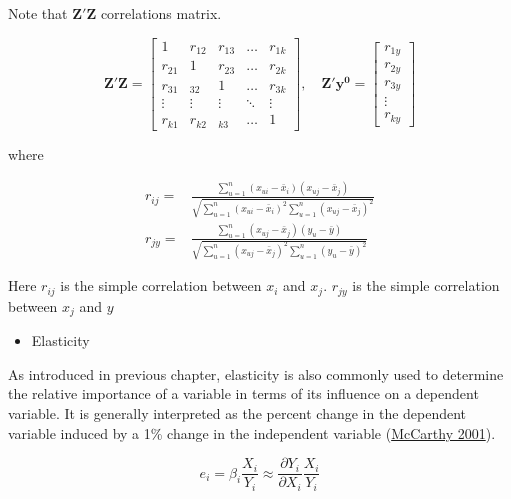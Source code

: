 \documentclass[
  11pt,
  openany]{memoir}
\providecommand{\tightlist}{%
  \setlength{\itemsep}{0pt}\setlength{\parskip}{0pt}}
\begin{document}
Note that \(\mathbf{Z'Z}\) correlations matrix.

\begin{equation}
\mathbf{Z'Z}=\begin{bmatrix} 
1 & r_{12} & r_{13} & \dots & r_{1k} \\  
r_{21} & 1 & r_{23} & \dots & r_{2k} \\  
r_{31} & _{32} & 1 & \dots & r_{3k} \\  
\vdots & \vdots & \vdots & \ddots & \vdots \\  
r_{k1} & r_{k2} & _{k3} & \dots & 1  \end{bmatrix},\quad 
\mathbf{Z'}\mathbf{y^{0}}=\begin{bmatrix} 
r_{1y} \\ r_{2y} \\ r_{3y} \\ \vdots \\ r_{ky} \end{bmatrix}
\label{eq:corr-matrix}
\end{equation}

where

\begin{equation}
\begin{split}
r_{ij}=&\frac{\sum_{u=1}^{n}(x_{ui}-\bar x_i)(x_{uj}-\bar x_j)}{\sqrt{\sum_{u=1}^{n}(x_{ui}-\bar x_i)^2\sum_{u=1}^{n}(x_{uj}-\bar x_j)^2}}\\
r_{jy}=&\frac{\sum_{u=1}^{n}(x_{uj}-\bar x_j)(y_{u}-\bar y)}{\sqrt{\sum_{u=1}^{n}(x_{uj}-\bar x_j)^2\sum_{u=1}^{n}(y_{u}-\bar y)^2}}
\end{split}
\label{eq:corr-1}
\end{equation}

Here \(r_{ij}\) is the simple correlation between \(x_i\) and \(x_j\). \(r_{jy}\) is the simple correlation between \(x_j\) and \(y\)

\begin{itemize}
\tightlist
\item
  Elasticity
\end{itemize}

As introduced in previous chapter, elasticity is also commonly used to determine the relative importance of a variable in terms of its influence on a dependent variable. It is generally interpreted as the percent change in the dependent variable induced by a 1\% change in the independent variable (\protect\hyperlink{ref-mccarthyTransportationEconomicsTheory2001}{McCarthy 2001}).

\[e_i=\beta_i\frac{X_i}{Y_i}\approx\frac{\partial Y_i}{\partial X_i}\frac{X_i}{Y_i}\]
\end{document}
